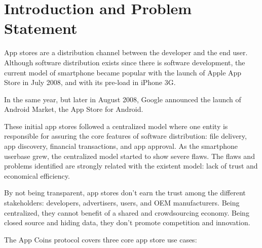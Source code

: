 
\section{Introduction and Problem Statement}




App stores are a distribution channel between the developer and the end user. Although software distribution exists since there is software development, the current model of smartphone became popular with the launch of Apple App Store in July 2008, and with its pre-load in iPhone 3G.

In the same year, but later in August 2008, Google announced the launch of Android Market\cite{wiki:market}, the App Store for Android.

These initial app stores followed a centralized model where one entity is responsible for assuring the core features of software distribution: file delivery, app discovery, financial transactions, and app approval. As the smartphone userbase grew, the centralized model started to show severe flaws. The flaws and problems identified are strongly related with the existent model: lack of trust and economical efficiency. 

By not being transparent, app stores don't earn the trust among the different stakeholders: developers, advertisers, users, and OEM manufacturers. Being centralized, they cannot benefit of a shared and crowdsourcing economy. Being closed source and hiding data, they don't promote competition and innovation.


The App Coins protocol covers three core app store use cases:

